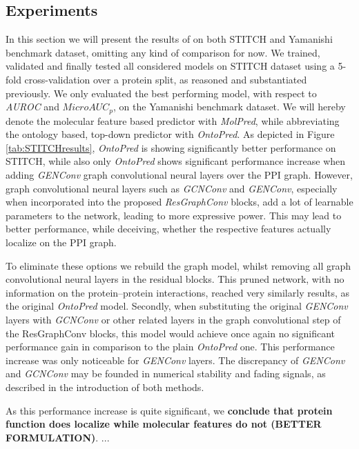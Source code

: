 \documentclass{bioinfo}
\begin{document}
\subsection{Experiments}
In this section we will present the results of \name on both STITCH and Yamanishi benchmark dataset, omitting any kind of comparison for now. We trained, validated and finally tested all considered models on STITCH dataset using a 5-fold cross-validation over a protein split, as reasoned and substantiated previously. We only evaluated the best performing model, with respect to \textit{AUROC} and $MicroAUC_p$, on the Yamanishi benchmark dataset. 
We will hereby denote the molecular feature based predictor with \textit{MolPred}, while abbreviating the ontology based, top-down predictor with \textit{OntoPred}. As depicted in Figure \ref{tab:STITCHresults}, \textit{OntoPred} is showing significantly better performance on STITCH, while also only \textit{OntoPred} shows significant performance increase when adding \textit{GENConv} graph convolutional neural layers over the PPI graph. However, graph convolutional neural layers such as \textit{GCNConv} and \textit{GENConv}, especially when incorporated into the proposed \textit{ResGraphConv} blocks, add a lot of learnable parameters to the network, leading to more expressive power. This may lead to better performance, while deceiving, whether the respective features actually localize on the PPI graph. 

To eliminate these options we rebuild the graph model, whilst removing all graph convolutional neural layers in the residual blocks. This pruned network, with no information on the protein--protein interactions, reached very similarly results, as the original \textit{OntoPred} model. Secondly, when substituting the original \textit{GENConv} layers with \textit{GCNConv} or other related layers in the graph convolutional step of the ResGraphConv blocks, this model would achieve once again no significant performance gain in comparison to the plain \textit{OntoPred} one. This performance increase was only noticeable for \textit{GENConv} layers. The discrepancy of \textit{GENConv} and \textit{GCNConv} may be founded in numerical stability and fading signals, as described in the introduction of both methods. 

As this performance increase is quite significant, we \textbf{conclude that protein function does localize while molecular features do not (BETTER FORMULATION)}. ...
\end{document}
